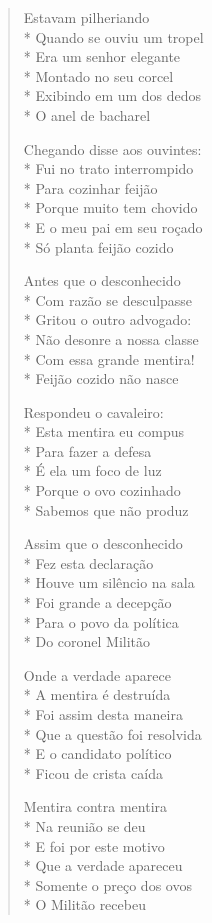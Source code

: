 \begin{verse}
Estavam pilheriando\\*
Quando se ouviu um tropel\\*
Era um senhor elegante\\*
Montado no seu corcel\\*
Exibindo em um dos dedos\\*
O anel de bacharel

Chegando disse aos ouvintes:\\*
Fui no trato interrompido\\*
Para cozinhar feijão\\*
Porque muito tem chovido\\*
E o meu pai em seu roçado\\*
Só planta feijão cozido

Antes que o desconhecido\\*
Com razão se desculpasse\\*
Gritou o outro advogado:\\*
Não desonre a nossa classe\\*
Com essa grande mentira!\\*
Feijão cozido não nasce

Respondeu o cavaleiro:\\*
Esta mentira eu compus\\*
Para fazer a defesa\\*
É ela um foco de luz\\*
Porque o ovo cozinhado\\*
Sabemos que não produz

Assim que o desconhecido\\*
Fez esta declaração\\*
Houve um silêncio na sala\\*
Foi grande a decepção\\*
Para o povo da política\\*
Do coronel Militão

Onde a verdade aparece\\*
A mentira é destruída\\*
Foi assim desta maneira\\*
Que a questão foi resolvida\\*
E o candidato político\\*
Ficou de crista caída

Mentira contra mentira\\*
Na reunião se deu\\*
E foi por este motivo\\*
Que a verdade apareceu\\*
Somente o preço dos ovos\\*
O Militão recebeu


\end{verse}
